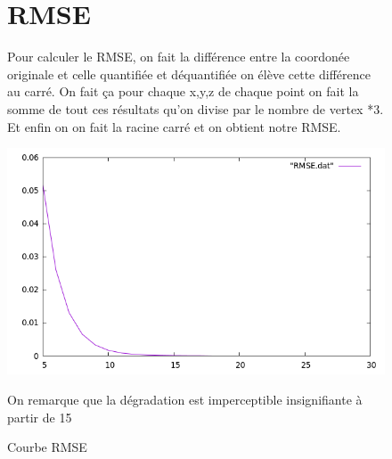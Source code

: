 \documentclass{article}
\begin{document}
\begin{figure}[h!]
\section{RMSE}
Pour calculer le RMSE, on fait la différence entre la coordonée originale et celle quantifiée et déquantifiée on élève cette différence au carré.
On fait ça pour chaque x,y,z de chaque point on fait la somme de tout ces résultats qu'on divise par le nombre de vertex *3. 
Et enfin on on fait la racine carré et on obtient notre RMSE.
\centerline{\includegraphics[scale=0.8]{./rendus/rmse.png}}
\caption{Courbe RMSE}
On remarque que la dégradation est imperceptible insignifiante à partir de 15
\end{figure}
 
\end{document}
